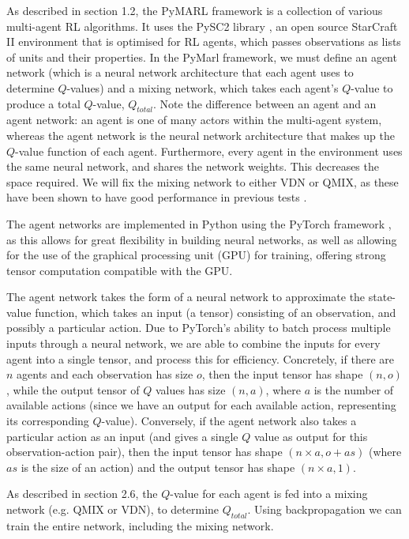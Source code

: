As described in section 1.2, the PyMARL framework is a collection of various multi-agent RL algorithms. It uses the PySC2 library \cite{pysc2}, an open source StarCraft II environment that is optimised for RL agents, which passes observations as lists of units and their properties. In the PyMarl framework, we must define an agent network (which is a neural network architecture that each agent uses to determine $Q$-values) and a mixing network, which takes each agent's $Q$-value to produce a total $Q$-value, $Q_{total}$. Note the difference between an agent and an agent network: an agent is one of many actors within the multi-agent system, whereas the agent network is the neural network architecture that makes up the $Q$-value function of each agent. Furthermore, every agent in the environment uses the same neural network, and shares the network weights. This decreases the space required. We will fix the mixing network to either VDN or QMIX, as these have been shown to have good performance in previous tests \cite{smac}. 

The agent networks are implemented in Python using the PyTorch framework \cite{pytorch}, as this allows for great flexibility in building neural networks, as well as allowing for the use of the graphical processing unit (GPU) for training, offering strong tensor computation compatible with the GPU.

The agent network takes the form of a neural network to approximate the state-value function, which takes an input (a tensor) consisting of an observation, and possibly a particular action. Due to PyTorch's ability to batch process multiple inputs through a neural network, we are able to combine the inputs for every agent into a single tensor, and process this for efficiency. Concretely, if there are $n$ agents and each observation has size $o$, then the input tensor has shape $(n, o)$, while the output tensor of $Q$ values has size $(n, a)$, where $a$ is the number of available actions (since we have an output for each available action, representing its corresponding $Q$-value). Conversely, if the agent network also takes a particular action as an input (and gives a single $Q$ value as output for this observation-action pair), then the input tensor has shape $(n \times a, o+as)$ (where $as$ is the size of an action) and the output tensor has shape $(n \times a, 1)$.

As described in section 2.6, the $Q$-value for each agent is fed into a mixing network (e.g. QMIX or VDN), to determine $Q_{total}$. Using backpropagation we can train the entire network, including the mixing network.

